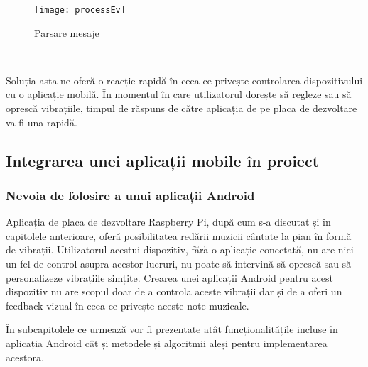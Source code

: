 \documentclass[../IoMusT.tex]{subfiles}
\begin{document}
\begin{figure}[h]
\centering
\texttt{[image: processEv]}
\caption{Parsare mesaje}
\label{fig:processEv}
\end{figure} 
\\
\par Soluția asta ne oferă o reacție rapidă în ceea ce privește controlarea dispozitivului cu o aplicație mobilă. În momentul în care utilizatorul dorește să regleze sau să oprescă vibrațiile, timpul de răspuns de către aplicația de pe placa de dezvoltare va fi una rapidă. 
\subsection{Integrarea unei aplicații mobile în proiect}
\subsubsection{Nevoia de folosire a unui aplicații Android}
Aplicația de placa de dezvoltare Raspberry Pi, după cum s-a discutat și în capitolele anterioare, oferă posibilitatea redării muzicii cântate la pian în formă de vibrații. Utilizatorul acestui dispozitiv, fără o aplicație conectată, nu are nici un fel de control asupra acestor lucruri, nu poate să intervină să oprescă sau să personalizeze vibrațiile simțite. Crearea unei aplicații Android pentru acest dispozitiv nu are scopul doar de a controla aceste vibrații dar și de a oferi un feedback vizual în ceea ce privește aceste note muzicale. 
\\
\par În subcapitolele ce urmează vor fi prezentate atât funcționalitățile incluse în aplicația Android cât și metodele și algoritmii aleși pentru implementarea acestora.
\end{document}
